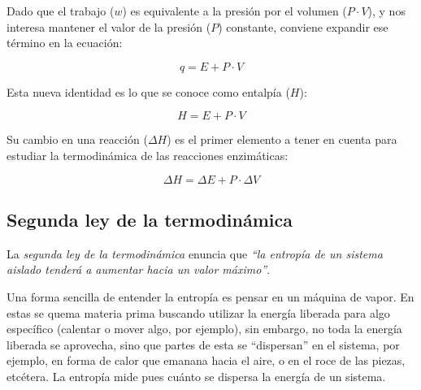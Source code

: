 Dado que el trabajo ($w$) es equivalente a la presión por el volumen ($P \cdot V$), y nos interesa mantener el valor de la presión ($P$) constante, conviene expandir ese término en la ecuación:

\begin{equation}
    q = E + P \cdot V
\end{equation}

Esta nueva identidad es lo que se conoce como entalpía ($H$):


\begin{equation*}
    H = E + P \cdot V
\end{equation*}

Su cambio en una reacción ($\Delta H$) es el primer elemento a tener en cuenta para estudiar la termodinámica de las reacciones enzimáticas:

\begin{equation}
    \Delta H = \Delta E + P \cdot \Delta V
\end{equation}

\subsection{Segunda ley de la termodinámica}

La \emph{segunda ley de la termodinámica} enuncia que \textit{``la entropía de un sistema aislado tenderá a aumentar hacia un valor máximo''}\citep{mathewsBioquimica2002}.



Una forma sencilla de entender la entropía es pensar en un máquina de vapor. En estas se quema materia prima buscando utilizar la energía liberada para algo específico (calentar o mover algo, por ejemplo), sin embargo, no toda la energía liberada se aprovecha, sino que partes de esta se ``dispersan'' en el sistema, por ejemplo, en forma de calor que emanana hacia el aire, o en el roce de las piezas, etcétera. La entropía mide pues cuánto se dispersa la energía de un sistema.


